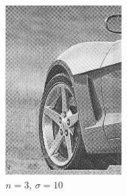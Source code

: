 \documentclass[
	12pt, %
]{style/fphw}
\begin{document}
\begin{figure}[H]
\begin{subfigure}[b]{.22\textwidth}
             \includegraphics[width=\textwidth]{plots2/Q5_3_2_10.png}
             \caption{$n=3$, $\sigma=10$}
             \label{Q5_3_3_10}
         \end{subfigure}
         \hfill
         \begin{subfigure}[b]{.22\textwidth}
             \centering

\end{subfigure}
\end{figure}
\end{document}
